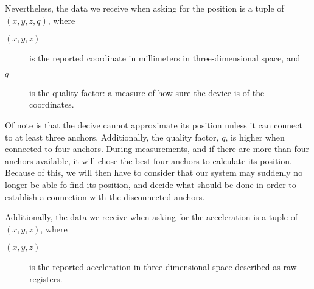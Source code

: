 Nevertheless, the data we receive when asking for the position is a tuple of
$(x, y, z, q)$, where
\begin{description}
\item[$(x, y, z)$] is the reported coordinate in millimeters in three-dimensional space, and
\item[$q$] is the quality factor: a measure of how sure the device is of the coordinates.
\end{description}

Of note is that the decive cannot approximate its position unless it can connect to at least three anchors.
Additionally, the quality factor, $q$, is higher when connected to four anchors.
During measurements, and if there are more than four anchors available, it will chose the best four anchors to calculate its position. %
Because of this, we will then have to consider that our system may suddenly no longer be able fo find its position,
and decide what should be done in order to establish a connection with the disconnected anchors.

Additionally, the data we receive when asking for the acceleration is a tuple of $(x, y, z)$, where
\begin{description}
\item[$(x, y, z)$] is the reported acceleration in three-dimensional space described as raw registers.
\end{description}




